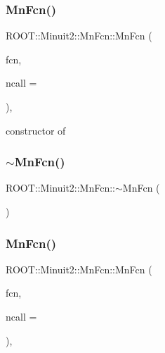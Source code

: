 \subsubsection{\texorpdfstring{MnFcn()}{MnFcn()}\hspace{0.1cm}{\footnotesize\ttfamily [1/2]}}
{\footnotesize\ttfamily R\+O\+O\+T\+::\+Minuit2\+::\+Mn\+Fcn\+::\+Mn\+Fcn (\begin{DoxyParamCaption}\item[{const \mbox{\hyperlink{classROOT_1_1Minuit2_1_1FCNBase}{F\+C\+N\+Base}} \&}]{fcn,  }\item[{int}]{ncall = {} }\end{DoxyParamCaption})\hspace{0.3cm}{\ttfamily [inline]}, {\ttfamily [explicit]}}



constructor of 

\mbox{\label{classROOT_1_1Minuit2_1_1MnFcn_a5b9ed490eb8084814d0b8e4d76c61adc}} 
\subsubsection{\texorpdfstring{$\sim$MnFcn()}{~MnFcn()}\hspace{0.1cm}{\footnotesize\ttfamily [1/2]}}
{\footnotesize\ttfamily R\+O\+O\+T\+::\+Minuit2\+::\+Mn\+Fcn\+::$\sim$\+Mn\+Fcn (\begin{DoxyParamCaption}{ }\end{DoxyParamCaption})\hspace{0.3cm}{\ttfamily [virtual]}}

\mbox{\label{classROOT_1_1Minuit2_1_1MnFcn_a882c5c26556515b2bbe0d07f50b32f4f}} 
\subsubsection{\texorpdfstring{MnFcn()}{MnFcn()}\hspace{0.1cm}{\footnotesize\ttfamily [2/2]}}
{\footnotesize\ttfamily R\+O\+O\+T\+::\+Minuit2\+::\+Mn\+Fcn\+::\+Mn\+Fcn (\begin{DoxyParamCaption}\item[{const \mbox{\hyperlink{classROOT_1_1Minuit2_1_1FCNBase}{F\+C\+N\+Base}} \&}]{fcn,  }\item[{int}]{ncall = {} }\end{DoxyParamCaption})\hspace{0.3cm}{\ttfamily [inline]}, {\ttfamily [explicit]}}



